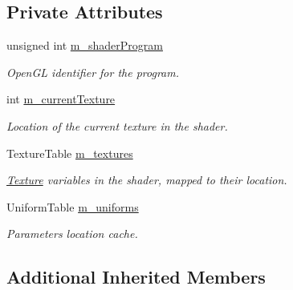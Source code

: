 \subsection*{Private Attributes}
\begin{DoxyCompactItemize}
\item 
\mbox{\label{classsf_1_1_shader_a72169743cfd7206fd49759f705a15466}} 
unsigned int \mbox{\hyperlink{classsf_1_1_shader_a72169743cfd7206fd49759f705a15466}{m\+\_\+shader\+Program}}
\begin{DoxyCompactList}\small\item\em Open\+GL identifier for the program. \end{DoxyCompactList}\item 
\mbox{\label{classsf_1_1_shader_a5d7b43495def6cc6bd91b6c5d167a485}} 
int \mbox{\hyperlink{classsf_1_1_shader_a5d7b43495def6cc6bd91b6c5d167a485}{m\+\_\+current\+Texture}}
\begin{DoxyCompactList}\small\item\em Location of the current texture in the shader. \end{DoxyCompactList}\item 
\mbox{\label{classsf_1_1_shader_a3daecf04a0045a1d7445959432b5a52f}} 
Texture\+Table \mbox{\hyperlink{classsf_1_1_shader_a3daecf04a0045a1d7445959432b5a52f}{m\+\_\+textures}}
\begin{DoxyCompactList}\small\item\em \mbox{\hyperlink{classsf_1_1_texture}{Texture}} variables in the shader, mapped to their location. \end{DoxyCompactList}\item 
\mbox{\label{classsf_1_1_shader_a1bf3ba9e8ca3842a9b4cb084443d0477}} 
Uniform\+Table \mbox{\hyperlink{classsf_1_1_shader_a1bf3ba9e8ca3842a9b4cb084443d0477}{m\+\_\+uniforms}}
\begin{DoxyCompactList}\small\item\em Parameters location cache. \end{DoxyCompactList}\end{DoxyCompactItemize}
\subsection*{Additional Inherited Members}


